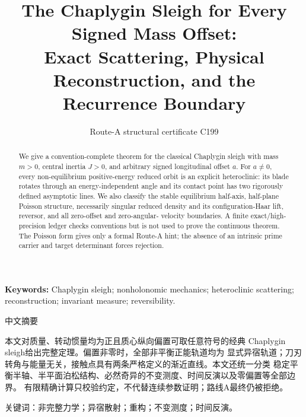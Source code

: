 \documentclass[9pt]{extarticle}
\title{The Chaplygin Sleigh for Every Signed Mass Offset:\\
Exact Scattering, Physical Reconstruction, and the Recurrence Boundary}
\author{Route-A structural certificate C199}
\date{}
\begin{document}
\maketitle

\begin{abstract}
We give a convention-complete theorem for the classical Chaplygin sleigh with
mass $m>0$, central inertia $J>0$, and arbitrary signed longitudinal offset
$a$.  For $a\ne0$, every non-equilibrium positive-energy reduced orbit is an
explicit heteroclinic: its blade rotates through an energy-independent angle
and its contact point has two rigorously defined asymptotic lines.  We also classify
the stable equilibrium half-axis, half-plane Poisson structure, necessarily
singular reduced density and its configuration-Haar lift, reversor, and all zero-offset and zero-angular-
velocity boundaries.  A finite exact/high-precision ledger checks conventions
but is not used to prove the continuous theorem.  The Poisson form gives only
a formal Route-A hint; the absence of an intrinsic prime carrier and target
determinant forces rejection.
\end{abstract}
\noindent\textbf{Keywords:} Chaplygin sleigh; nonholonomic mechanics;
heteroclinic scattering; reconstruction; invariant measure; reversibility.

\begin{otherlanguage}{chinese-simplified}
\begin{center}{\large 中文摘要}\end{center}
本文对质量、转动惯量均为正且质心纵向偏置可取任意符号的经典
\foreignlanguage{english}{Chaplygin sleigh}给出完整定理。偏置非零时，全部非平衡正能轨道均为
显式异宿轨道；刀刃转角与能量无关，接触点具有两条严格定义的渐近直线。本文还统一分类
稳定平衡半轴、半平面泊松结构、必然奇异的不变测度、时间反演以及零偏置等全部边界。
有限精确计算只校验约定，不代替连续参数证明；路线\foreignlanguage{english}{A}最终仍被拒绝。

\noindent 关键词：非完整力学；异宿散射；重构；不变测度；时间反演。
\end{otherlanguage}
\end{document}
